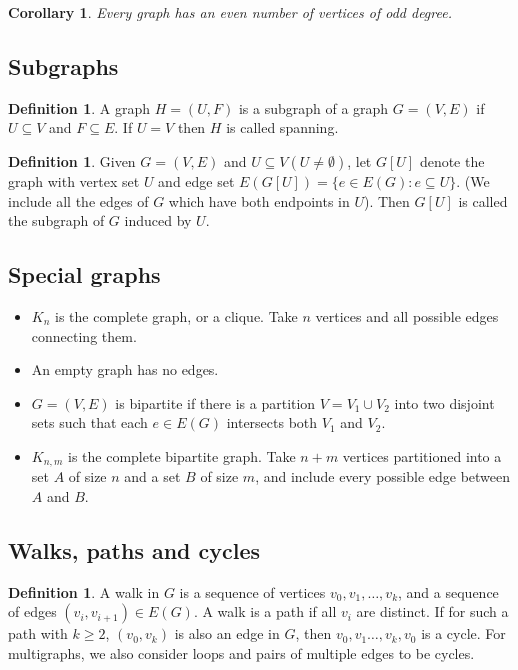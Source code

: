 \documentclass[11pt, fleqn, a4paper, landscape]{article}
\theoremstyle{plain} %
\newtheorem{cor}[thm]{Corollary}
\theoremstyle{remark} %
\theoremstyle{definition} %
\newtheorem{defi}[thm]{Definition}
\begin{document}
\begin{multicols}{3}
\begin{cor}
Every graph has an even number of vertices of odd degree.
\end{cor}

\subsection{Subgraphs}

\begin{defi}
A graph $H = (U, F)$ is a subgraph of a graph $G = (V,E)$ if $U \subseteq V$ and $F \subseteq E$. If $U = V$ then $H$ is called spanning.
\end{defi}

\begin{defi}
Given $G = (V,E)$ and $U\subseteq  V (U \ne \emptyset)$, let $G[U]$ denote the graph with vertex set $U$ and edge set $E(G[U]) = \{e \in E(G) : e \subseteq U\}$. (We include all the edges of $G$ which have both
endpoints in $U$). Then $G[U]$ is called the subgraph of $G$ induced by $U$.
\end{defi}
\addtocounter{thm}{1}
\subsection{Special graphs}

\begin{itemize}
\item  $K_n$ is the complete graph, or a clique. Take $n$ vertices and all possible edges connecting them.
\item An empty graph has no edges.
\item $G = (V,E)$ is bipartite if there is a partition $V = V_1 \cup V_2$ into two disjoint sets such that each $e \in E(G)$ intersects both $V_1$ and $V_2$.
\item $K_{n,m}$ is the complete bipartite graph. Take $n + m$ vertices partitioned into a set $ A$ of size $n$ and a set $B$ of size $m$, and include every possible edge between $A$ and $B$.
\end{itemize}
\addtocounter{thm}{1}
\subsection{Walks, paths and cycles}

\begin{defi}
A walk in $G$ is a sequence of vertices $v_0, v_1, \dots , v_k$, and a sequence of edges $(v_i, v_{i+1}) \in E(G)$. A walk is a path if all $v_i$ are distinct. If for such a path with $k \ge 2$, $(v_0, v_k)$ is also
an edge in $G$, then $v_0, v_1 \dots , v_k, v_0$ is a cycle. For multigraphs, we also consider loops and pairs of multiple edges to be cycles.
\end{defi}


\end{multicols}
\end{document}
